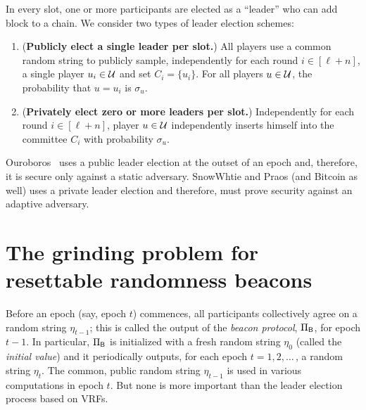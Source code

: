 In every slot, 
one or more participants are elected as a ``leader'' who can add block to a chain. 
We consider two types of leader election schemes: 
\begin{enumerate}[label=\textbf{Scheme \Alph*:},ref=\Alph*,leftmargin=6em]
    \item \label{lottery:public}
    (\textbf{Publicly elect a single leader per slot.})
    All players use a common random string to 
    publicly sample, 
    independently for each round $i \in [\ell + n]$, 
    a single player $u_i \in \mathcal{U}$ and  
    set $C_i = \{u_i\}$. 
    For all players $u \in \mathcal{U}$, 
    the probability that $u = u_i$ is $\sigma_u$.

    \item \label{lottery:private}
    (\textbf{Privately elect zero or more leaders per slot.})
    Independently for each round $i \in [\ell + n]$, 
    player $u \in \mathcal{U}$ 
    independently inserts himself 
    into the committee $C_i$ 
    with probability $\sigma_u$. 
\end{enumerate}
\noindent
Ouroboros~\cite{Ouroboros} uses a public leader election 
at the outset of an epoch 
and, therefore, it is secure only against a static adversary. 
SnowWhtie and Praos (and Bitcoin as well) uses a private leader election 
and therefore, must prove security against an adaptive adversary. 


\section{The grinding problem for resettable randomness beacons}\label{beacon-model}
Before an epoch (say, epoch $t$) commences, 
all participants collectively agree on a random string $\eta_{t-1}$; 
this is called the output of the \emph{beacon protocol}, $\Pi_{\mathsf{B}}$, 
for epoch $t - 1$. 
In particular, $\Pi_{\mathsf{B}}$ is initialized with a fresh random string $\eta_0$ 
(called the \emph{initial value})
and it periodically outputs, for each epoch $t = 1, 2, \ldots$\,, 
a random string $\eta_t$. 
The common, public random string $\eta_{t-1}$ 
is used in various computations in epoch $t$. 
But none is more important than the leader election process 
based on VRFs.

